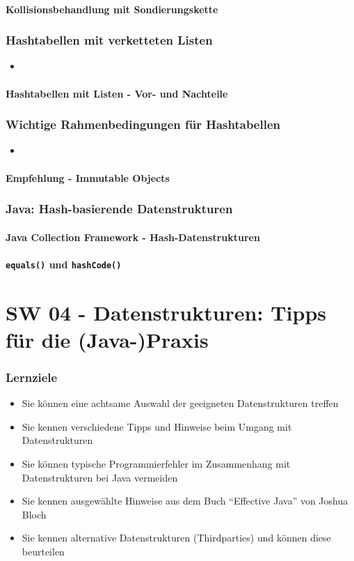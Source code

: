 \subsection{Kollisionsbehandlung mit Sondierungskette}

\section{Hashtabellen mit verketteten Listen}
\begin{itemize}
    \item
\end{itemize}
\subsection{Hashtabellen mit Listen - Vor- und Nachteile}

\section{Wichtige Rahmenbedingungen für Hashtabellen}
\begin{itemize}
    \item
\end{itemize}
\subsection{Empfehlung - Immutable Objects}

\section{Java: Hash-basierende Datenstrukturen}
\subsection{Java Collection Framework - Hash-Datenstrukturen}
\subsection{\texttt{equals()} und \texttt{hashCode()}}

\part{SW 04 - Datenstrukturen: Tipps für die (Java-)Praxis}
\section{Lernziele}
\begin{itemize}
    \item Sie können eine achtsame Auswahl der geeigneten Datenstrukturen treffen
    \item Sie kennen verschiedene Tipps und Hinweise beim Umgang mit Datenstrukturen
    \item Sie können typische Programmierfehler im Zusammenhang mit Datenstrukturen bei Java vermeiden
    \item Sie kennen ausgewählte Hinweise aus dem Buch "`Effective Java"' von Joshua Bloch
    \item Sie kennen alternative Datenstrukturen (Thirdparties) und können diese beurteilen
\end{itemize}

